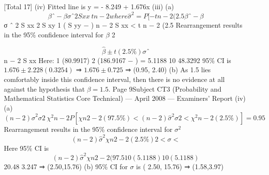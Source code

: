 \documentclass[a4paper,12pt]{article}
\begin{document}
[Total 17]
(iv)
\newpage
Fitted line is y = - 8.249 + 1.676x
(iii)
(a)
\[
\beta ˆ − \beta
σ ˆ 2
S xx
~ t n − 2 where\hat{\sigma}^2 =
P [ − t n − 2 (2.5%
\beta ˆ − \beta
\]
σ ˆ 2
S xx
2
S xy
1
( S yy −
)
n − 2
S xx
< t n − 2 (2.5%
Rearrangement results in the 95\% confidence interval for $\beta$
2

\[ \hat{\beta} \pm t (2.5\%)\sigma ˆ\]
n − 2
S xx
Here: %
1
(80.9917) 2
(186.9167 −
) = 5.1188
10
48.3292
95\% CI is $1.676 \pm 2.228(0.3254)$ ⇒ $1.676 \pm 0.725$ ⇒ (0.95, 2.40)
(b)
As 1.5 lies comfortably inside this confidence interval, then there is no
evidence at all against the hypothesis that $\beta = 1.5$.
Page 9Subject CT3 (Probability and Mathematical Statistics Core Technical) — April 2008 — Examiners’ Report
(iv)
(a)
\[( n − 2)\hat{\sigma}^2
σ
2
~ \chi^2 n − 2
P [ χ n 2 − 2 (97.5\%) <
( n − 2)\hat{\sigma}^2
σ
2
< \chi^2 n − 2 (2.5\%)] = 0.95\]
Rearrangement results in the 95\% confidence interval for $\sigma^2$
\[( n − 2)\hat{\sigma}^2
χ n 2 − 2 (2.5\%)
2
<σ <\]
Here 95\% CI is
\[( n − 2)\hat{\sigma}^2
χ n 2 − 2 (97.5%
10(5.1188)
10(5.1188)\]
20.48
3.247
⇒ (2.50,15.76)
(b)
95\% CI for $\sigma$ is ( 2.50, 15.76) ⇒ (1.58,3.97)
\end{document}
